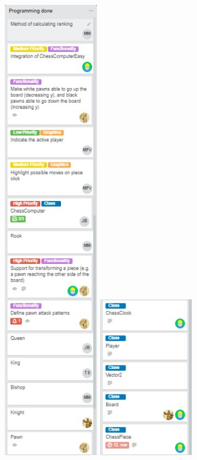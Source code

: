 \documentclass{article}
\begin{document}
\includegraphics[width=4cm]{20180508-programmingdone2.jpg}
\includegraphics[width=4cm]{20180508-programmingdone3.jpg} \\
\end{document}
